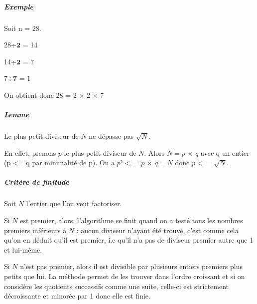 \documentclass[11pt,a4paper]{article}
\begin{document}
	\subparagraph{Exemple}
	Soit n = 28.
	
	28$\div$$\mathbf{2}$ = 14
	
	14$\div$$\mathbf{2}$ = 7
	
	7$\div$$\mathbf{7}$ = 1
	
	On obtient donc 28 = 2 $\times$ 2 $\times$ 7
	
	\subparagraph{Lemme}
	
	Le plus petit diviseur de $\mathit{N}$ ne dépasse pas $\sqrt{N}$.
	
	En effet, prenons $p$ le plus petit diviseur de $\mathit{N}$. Alors $\mathit{N = p}$ $\times$ $\mathit{q}$  avec q un entier (p <= q par minimalité de p). On a $\mathit{p² <= p}$ $\times$ $\mathit{q = N}$ donc $\mathit{p <= }$$\sqrt{N}$. 
	
	\subparagraph{Critère de finitude}	
	
	Soit $\mathit{N}$ l'entier que l'on veut factoriser. 
	
	Si $\mathit{N}$ est premier, alors, l'algorithme se finit quand on a testé tous les nombres premiers inférieurs à $\mathit{N}$ : aucun diviseur n'ayant été trouvé, c'est comme cela qu'on en déduit qu'il est premier, i.e qu'il n'a pas de diviseur premier autre que 1 et lui-même. 
	
	Si $\mathit{N}$ n'est pas premier, alors il est divisible par plusieurs entiers premiers plus petits que lui. La méthode permet de les trouver dans l'ordre croissant et si on considère les quotients successifs comme une suite, celle-ci est strictement décroissante et minorée par 1 donc elle est finie.
	
\end{document}
